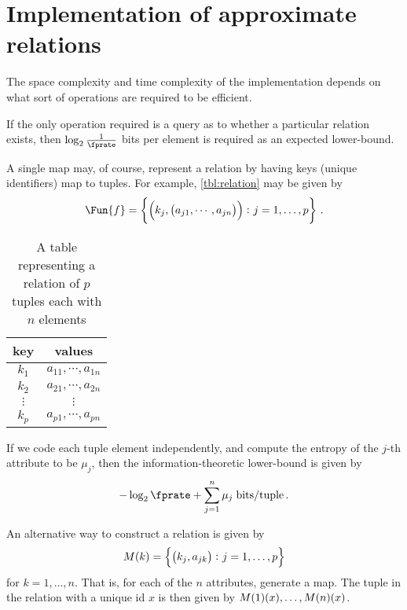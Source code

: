 \documentclass[ ../main.tex]{subfiles}
\begin{document}


\section{Implementation of approximate relations}
The space complexity and time complexity of the implementation depends on what sort of operations are required to be efficient.

If the only operation required is a query as to whether a particular relation exists, then $\log_2 \frac{1}{\fprate}$ bits per element is required as an expected lower-bound.

A single map may, of course, represent a relation by having keys (unique identifiers) map to tuples. For example, \cref{tbl:relation} may be given by
\begin{equation}
    \Fun{f} = \left\{
        \left(k_j, \left(a_{j 1}, \cdots, a_{j n}\right)\right) \colon j = 1,\ldots,p
    \right\}\,.
\end{equation}

\begin{table}[h]
\centering
\caption{A table representing a relation of $p$ tuples each with $n$ elements}
\label{tbl:relation_tuple_value}
\begin{tabular}{|c c|} 
\hline
key & values\\
\hline
    $k_1$ & $a_{1 1},\cdots,a_{1 n}$\\
    $k_2$ & $a_{2 1},\cdots,a_{2 n}$\\
    $\vdots$ & $\vdots$\\
    $k_p$ & $a_{p 1},\cdots,a_{p n}$\\
\hline
\end{tabular}
\end{table}

If we code each tuple element independently, and compute the entropy of the $j$-th attribute to be $\mu_j$, then the information-theoretic lower-bound is given by
\begin{equation}
    -\log_2 \fprate + \sum_{j=1}^{n} \mu_j \; \si{bits \per tuple}\,.
\end{equation}

An alternative way to construct a relation is given by
\begin{equation}
    M(k) =
    \left\{
        \left(k_j, a_{j k}\right) \colon j = 1,\ldots,p
    \right\}
\end{equation}
for $k=1,\ldots,n$. That is, for each of the $n$ attributes, generate a map. The tuple in the relation with a unique id $x$ is then given by $M(1)(x),\ldots,M(n)(x)$.
\end{document}
